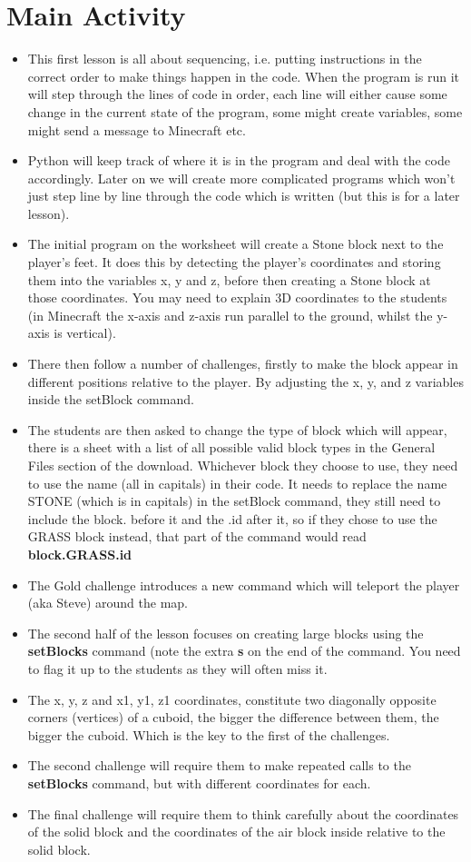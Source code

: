 \documentclass{geocraft-lesson-plan}
\begin{document}
\section*{Main Activity}
\begin{itemize}
\item This first lesson is all about sequencing, i.e. putting instructions in the correct order to make things happen in
  the code. When the program is run it will step through the lines of code in order, each line will either cause some
  change in the current state of the program, some might create variables, some might send a message to Minecraft etc.
\item Python will keep track of where it is in the program and deal with the code accordingly. Later on we will create
  more complicated programs which won't just step line by line through the code which is written (but this is for a
  later lesson).
\item The initial program on the worksheet will create a Stone block next to the player's feet. It does this by
  detecting the player's coordinates and storing them into the variables x, y and z, before then creating a Stone block
  at those coordinates. You may need to explain 3D coordinates to the students (in Minecraft the x-axis and z-axis run
  parallel to the ground, whilst the y-axis is vertical).
\item There then follow a number of challenges, firstly to make the block appear in different positions relative to the
  player. By adjusting the x, y, and z variables inside the setBlock command.
\item The students are then asked to change the type of block which will appear, there is a sheet with a list of all
  possible valid block types in the General Files section of the download. Whichever block they choose to use, they need
  to use the name (all in capitals) in their code. It needs to replace the name STONE (which is in capitals) in the
  setBlock command, they still need to include the block. before it and the .id after it, so if they chose to use the
  GRASS block instead, that part of the command would read \textbf{block.GRASS.id} 
\item The Gold challenge introduces a new command which will teleport the player (aka Steve) around the map.
\item The second half of the lesson focuses on creating large blocks using the \textbf{setBlocks} command (note the
  extra \textbf{s} on the end of the command. You need to flag it up to the students as they will often miss it.
\item The x, y, z and x1, y1, z1 coordinates, constitute two diagonally opposite corners (vertices) of a cuboid, the
  bigger the difference between them, the bigger the cuboid. Which is the key to the first of the challenges.
\item The second challenge will require them to make repeated calls to the \textbf{setBlocks} command, but with
  different coordinates for each.
\item The final challenge will require them to think carefully about the coordinates of the solid block and the
  coordinates of the air block inside relative to the solid block.
\end{itemize}
\end{document}

